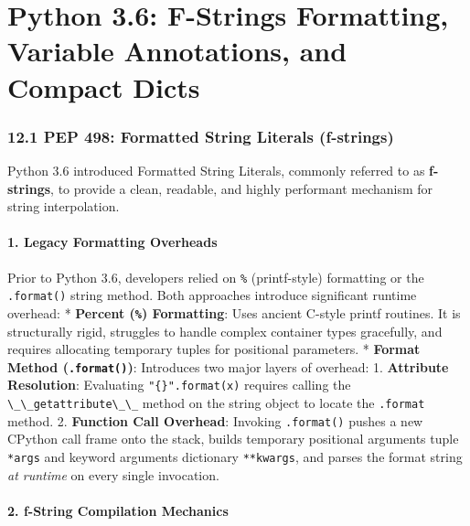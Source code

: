 \hypertarget{python-3.6-f-strings-formatting-variable-annotations-and-compact-dicts}{%
\chapter{Python 3.6: F-Strings Formatting, Variable Annotations, and
Compact
Dicts}\label{python-3.6-f-strings-formatting-variable-annotations-and-compact-dicts}}

\hypertarget{pep-498-formatted-string-literals-f-strings}{%
\subsection{12.1 PEP 498: Formatted String Literals
(f-strings)}\label{pep-498-formatted-string-literals-f-strings}}

Python 3.6 introduced Formatted String Literals, commonly referred to as
\textbf{f-strings}, to provide a clean, readable, and highly performant
mechanism for string interpolation.

\hypertarget{legacy-formatting-overheads}{%
\subsubsection{1. Legacy Formatting
Overheads}\label{legacy-formatting-overheads}}

Prior to Python 3.6, developers relied on \passthrough{\lstinline!\%!}
(printf-style) formatting or the \passthrough{\lstinline!.format()!}
string method. Both approaches introduce significant runtime overhead: *
\textbf{Percent (\passthrough{\lstinline!\%!}) Formatting}: Uses ancient
C-style printf routines. It is structurally rigid, struggles to handle
complex container types gracefully, and requires allocating temporary
tuples for positional parameters. * \textbf{Format Method
(\passthrough{\lstinline!.format()!})}: Introduces two major layers of
overhead: 1. \textbf{Attribute Resolution}: Evaluating
\passthrough{\lstinline!"\{\}".format(x)!} requires calling the
\passthrough{\lstinline!\_\_getattribute\_\_!} method on the string
object to locate the \passthrough{\lstinline!.format!} method. 2.
\textbf{Function Call Overhead}: Invoking
\passthrough{\lstinline!.format()!} pushes a new CPython call frame onto
the stack, builds temporary positional arguments tuple
\passthrough{\lstinline!*args!} and keyword arguments dictionary
\passthrough{\lstinline!**kwargs!}, and parses the format string
\emph{at runtime} on every single invocation.

\hypertarget{f-string-compilation-mechanics}{%
\subsubsection{2. f-String Compilation
Mechanics}\label{f-string-compilation-mechanics}}

